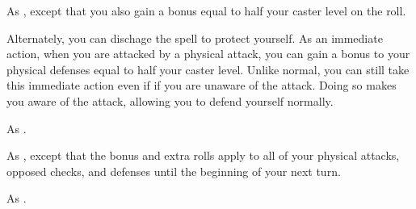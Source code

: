 \begin{spellheader}
    \begin{spelltargetinginfo}
    \end{spelltargetinginfo}
    \begin{spelleffects}
    \end{spelleffects}
\end{spellheader}
\begin{spellcontent}
    \spelleffect As , except that you also gain a bonus equal to half your caster level on the roll.

    Alternately, you can dischage the spell to protect yourself. As an immediate action, when you are attacked by a physical attack, you can gain a bonus to your physical defenses equal to half your caster level. Unlike normal, you can still take this immediate action even if if you are unaware of the attack. Doing so makes you aware of the attack, allowing you to defend yourself normally.
\end{spellcontent}
\begin{spellfooter}
    \spellnotes As .
\end{spellfooter}

\begin{spellheader}
    \begin{spelltargetinginfo}
    \end{spelltargetinginfo}
    \begin{spelleffects}
    \end{spelleffects}
\end{spellheader}
\begin{spellcontent}
    \spelleffect As , except that the bonus and extra rolls apply to all of your physical attacks, opposed checks, and defenses until the beginning of your next turn.
\end{spellcontent}
\begin{spellfooter}
    \spellnotes As .
\end{spellfooter}

